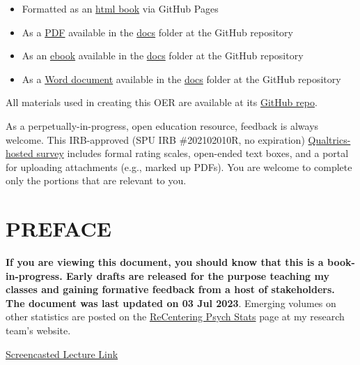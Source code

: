 \documentclass[
  11pt,
]{book}
\providecommand{\tightlist}{%
  \setlength{\itemsep}{0pt}\setlength{\parskip}{0pt}}
\begin{document}
\begin{itemize}
\tightlist
\item
  Formatted as an \href{https://lhbikos.github.io/ReCenterPsychStats/}{html book} via GitHub Pages
\item
  As a \href{https://github.com/lhbikos/ReCenterPsychStats/blob/main/docs/ReCenterPsychStats.pdf}{PDF} available in the \href{https://github.com/lhbikos/ReCenterPsychStats/tree/main/docs}{docs} folder at the GitHub repository
\item
  As an \href{https://github.com/lhbikos/ReCenterPsychStats/blob/main/docs/ReCenterPsychStats.epub}{ebook} available in the \href{https://github.com/lhbikos/ReCenterPsychStats/tree/main/docs}{docs} folder at the GitHub repository
\item
  As a \href{https://github.com/lhbikos/ReCenterPsychStats/blob/main/docs/ReCenterPsychStats.docx}{Word document} available in the \href{https://github.com/lhbikos/ReCenterPsychStats/tree/main/docs}{docs} folder at the GitHub repository
\end{itemize}

All materials used in creating this OER are available at its \href{https://github.com/lhbikos/ReCenterPsychStats}{GitHub repo}.

As a perpetually-in-progress, open education resource, feedback is always welcome. This IRB-approved (SPU IRB \#202102010R, no expiration) \href{https://spupsych.az1.qualtrics.com/jfe/form/SV_0OnBLfut3VIOIS2}{Qualtrics-hosted survey} includes formal rating scales, open-ended text boxes, and a portal for uploading attachments (e.g., marked up PDFs). You are welcome to complete only the portions that are relevant to you.

\hypertarget{preface}{%
\chapter*{PREFACE}\label{preface}}


\textbf{If you are viewing this document, you should know that this is a book-in-progress. Early drafts are released for the purpose teaching my classes and gaining formative feedback from a host of stakeholders. The document was last updated on 03 Jul 2023}. Emerging volumes on other statistics are posted on the \href{https://lhbikos.github.io/BikosRVT/ReCenter.html}{ReCentering Psych Stats} page at my research team's website.

\href{https://spu.hosted.panopto.com/Panopto/Pages/Viewer.aspx?id=859e5312-abdb-4db8-8779-b00c00feae47}{Screencasted Lecture Link}
\end{document}
